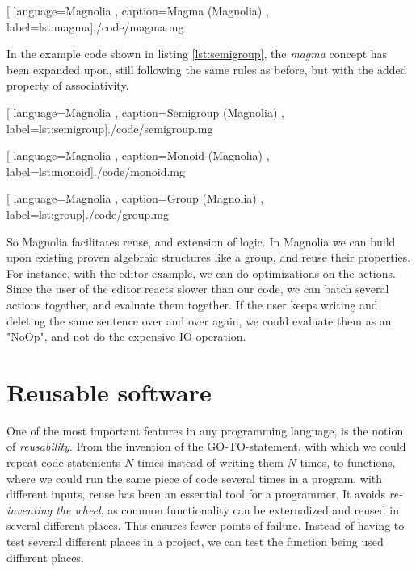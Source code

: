 \begin{center}
  
    [ language=Magnolia
    , caption={Magma (Magnolia)}
    , label=lst:magma]{./code/magma.mg}
\end{center}

In the example code shown in listing \ref{lst:semigroup}, the \textit{magma}
concept has been expanded upon, still following the same rules as before, but
with the added property of associativity.

\begin{center}
  
    [ language=Magnolia
    , caption={Semigroup (Magnolia)}
    , label=lst:semigroup]{./code/semigroup.mg}
\end{center}

\begin{center}
  
    [ language=Magnolia
    , caption={Monoid (Magnolia)}
    , label=lst:monoid]{./code/monoid.mg}
\end{center}

\begin{center}
  
    [ language=Magnolia
    , caption={Group (Magnolia)}
    , label=lst:group]{./code/group.mg}
\end{center}

So Magnolia facilitates reuse, and extension of logic. In Magnolia we can build
upon existing proven algebraic structures like a group, and reuse their
properties. For instance, with the editor example, we can do optimizations on
the actions. Since the user of the editor reacts slower than our code, we can
batch several actions together, and evaluate them together. If the user keeps
writing and deleting the same sentence over and over again, we could evaluate
them as an "NoOp", and not do the expensive IO operation.

\section{Reusable software}

One of the most important features in any programming language, is the notion
of \textit{reusability}. From the invention of the GO-TO-statement, with which
we could repeat code statements $N$ times instead of writing them $N$ times, to
functions, where we could run the same piece of code several times in a
program, with different inputs, reuse has been an essential tool for a
programmer. It avoids \textit{re-inventing the wheel}, as common functionality
can be externalized and reused in several different places. This ensures
fewer points of failure. Instead of having to test several different places in
a project, we can test the function being used different places.

